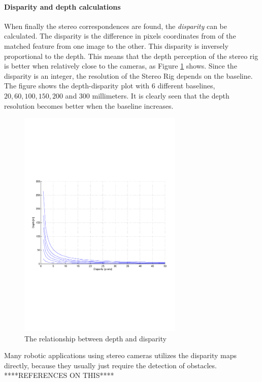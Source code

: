 \paragraph{Disparity and depth calculations}
When finally the stereo correspondences are found, the \emph{disparity} can be calculated.
The disparity is the difference in pixels coordinates from of the matched feature from one
image to the other. This disparity is inversely proportional to the depth. This means that
the depth perception of the stereo rig is better when relatively close to the cameras, as
Figure \ref{chap2:fig-disparity-depth} shows. 
Since the disparity is an integer, the resolution of the Stereo Rig depends on the
baseline. The figure shows the depth-disparity plot with 6 different baselines, $20,
60, 100, 150, 200$ and $300$ millimeters. It is clearly seen that the depth resolution becomes better
when the baseline increases. 
\begin{figure}[htbp]
    \centering
    \includegraphics[width=0.7\textwidth]{pics/disparity}
    \caption{The relationship between depth and disparity}
    \label{chap2:fig-disparity-depth}
\end{figure}

Many robotic applications using stereo cameras utilizes the disparity maps directly,
because they usually just require the detection of obstacles. ****REFERENCES ON THIS****

